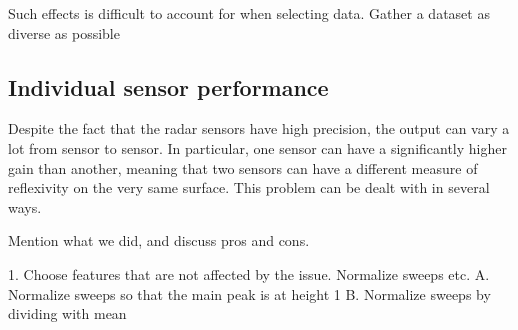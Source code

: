 \documentclass[a4paper, 12pt]{article}
\begin{document}
Such effects is difficult to account for when selecting data. Gather a dataset as diverse as possible

\subsection{Individual sensor performance}
Despite the fact that the radar sensors have high precision, the output can vary a lot from sensor to sensor. In particular, one sensor can have a significantly higher gain than another, meaning that two sensors can have a different measure of reflexivity on the very same surface. This problem can be dealt with in several ways. 

Mention what we did, and discuss pros and cons.

1. Choose features that are not affected by the issue. Normalize sweeps etc.
	A. Normalize sweeps so that the main peak is at height 1
	B. Normalize sweeps by dividing with mean 

\newpage


\end{document}
